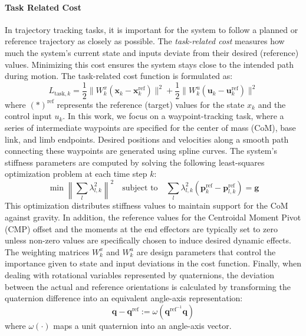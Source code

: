 \documentclass[main.tex]{subfiles}
\begin{document}
\paragraph{Task Related Cost}
In trajectory tracking tasks, it is important for the system to follow a planned or reference trajectory as closely as possible. The \textit{task-related cost} measures how much the system's current state and inputs deviate from their desired (reference) values. Minimizing this cost ensures the system stays close to the intended path during motion.
The task-related cost function is formulated as:
\begin{equation}
L_{\text{task},k} = \frac{1}{2} \| W^x_k (\mathbf{x}_k - \mathbf{x}^{\text{ref}}_k) \|^2 + \frac{1}{2} \| W^u_k (\mathbf{u}_k - \mathbf{u}^{\text{ref}}_k) \|^2
\end{equation}
where $(\ast)^{\text{ref}}$ represents the reference (target) values for the state $x_k$ and the control input $u_k$.
In this work, we focus on a waypoint-tracking task, where a series of intermediate waypoints are specified for the center of mass (CoM), base link, and limb endpoints. Desired positions and velocities along a smooth path connecting these waypoints are generated using spline curves.
The system's stiffness parameters are computed by solving the following least-squares optimization problem at each time step $k$:
\begin{equation}
\min \left\| \sum_l \lambda_{l,k}^2 \right\|^2 \quad \text{subject to} \quad \sum_l \lambda_{l,k}^2 (\mathbf{p}^{\text{ref}}_k - \mathbf{p}^{\text{ref}}_{l,k}) = \mathbf{g}
\end{equation}
This optimization distributes stiffness values to maintain support for the CoM against gravity.
In addition, the reference values for the Centroidal Moment Pivot (CMP) offset and the moments at the end effectors are typically set to zero unless non-zero values are specifically chosen to induce desired dynamic effects.
The weighting matrices $W^x_k$ and $W^u_k$ are design parameters that control the importance given to state and input deviations in the cost function.
Finally, when dealing with rotational variables represented by quaternions, the deviation between the actual and reference orientations is calculated by transforming the quaternion difference into an equivalent angle-axis representation:
\begin{equation}
\mathbf{q} - \mathbf{q}^{\text{ref}} := \omega(\mathbf{q}^{\text{ref}^{-1}} \mathbf{q})
\end{equation}
where $\omega(\cdot)$ maps a unit quaternion into an angle-axis vector.
\end{document}
